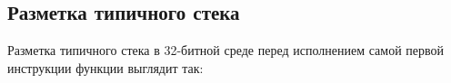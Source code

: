 \subsection{Разметка типичного стека}

Разметка типичного стека в 32-битной среде
перед исполнением самой первой инструкции функции выглядит так:




